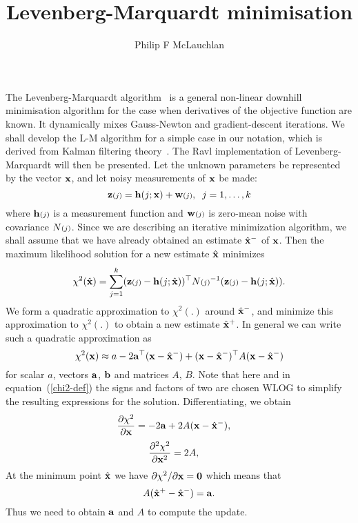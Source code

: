\documentclass{article}
\title{Levenberg-Marquardt minimisation}
\author{Philip F McLauchlan}
\date{}
\begin{document}
\setcounter{tocdepth}{3}
\setcounter{secnumdepth}{3}

\maketitle

The Levenberg-Marquardt
algorithm~\cite{Marquardt:JSIAM63,Bjorck:96}
is a general non-linear downhill minimisation algorithm
for the case when derivatives of the objective function are known.
It dynamically mixes Gauss-Newton and gradient-descent iterations.
We shall develop the L-M algorithm for a simple
case in our notation, which is derived from Kalman filtering
theory~\cite{BarShalom:Fortmann:88}. The Ravl implementation of
Levenberg-Marquardt will then be presented. Let the unknown parameters be
represented by the vector ${\bf x}$, and let noisy measurements of
${\bf x}$ be made:
\begin{equation}
 {\bf z}{\scriptstyle (j)} = {\bf h}(j;{\bf x}) + {\bf w}{\scriptstyle (j)},\;\;j=1,\ldots,k
 \label{measure_equation}
\end{equation}
where ${\bf h}{\scriptstyle (j)}$ is a measurement function and ${\bf w}{\scriptstyle (j)}$ is zero-mean
noise with covariance $N{\scriptstyle (j)}$. Since we are describing an iterative
minimization algorithm, we shall assume that we have already obtained
an estimate $\hat{\bf x}^-$ of ${\bf x}$.
Then the maximum likelihood solution for a new estimate $\hat{\bf x}$ minimizes
\begin{equation}
 \chi^2(\hat{\bf x}) = \sum_{j=1}^k ({\bf z}{\scriptstyle (j)}-{\bf h}(j;\hat{\bf x}))^{\top} N{\scriptstyle (j)}^{-1} ({\bf z}{\scriptstyle (j)}-{\bf h}(j;\hat{\bf x})).
 \label{chi2-def}
\end{equation}
We form a quadratic approximation to $\chi^2(.)$ around $\hat{\bf x}^-$, and minimize
this approximation to $\chi^2(.)$ to obtain a new estimate $\hat{\bf x}^+$.
In general we can write such a quadratic approximation as
\[ \chi^2({\bf x}) \approx a - 2{\bf a}^{\top}({\bf x}-\hat{\bf x}^-) + ({\bf x}-\hat{\bf x}^-)^{\top} A ({\bf x}-\hat{\bf x}^-)
\]
for scalar $a$, vectors ${\bf a}$, ${\bf b}$ and matrices $A$, $B$.
Note that here and in equation~(\ref{chi2-def}) the signs and factors of two
are chosen WLOG to simplify the resulting expressions for the solution.
Differentiating, we obtain
\[
 \frac{\partial \chi^2}{\partial {\bf x}} = - 2{\bf a} + 2A({\bf x}-\hat{\bf x}^-), \;\;\;\;
\]
\[
 \frac{\partial^2 \chi^2}{\partial {\bf x}^2} = 2A, \;\;\;\;
\]
At the minimum point $\hat{\bf x}$ we have $\partial \chi^2/\partial {\bf x}={\bf 0}$
which means that
\begin{equation}
 A (\hat{\bf x}^+-\hat{\bf x}^-) = {\bf a}.
 \label{chi2-min}
\end{equation}
Thus we need to obtain ${\bf a}$ and $A$ to compute the update.
\end{document}
